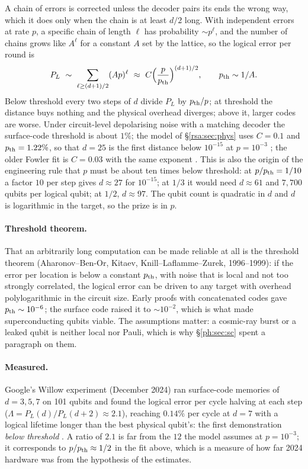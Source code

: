 A chain of errors is corrected unless the decoder pairs its ends the wrong way, which it does
only when the chain is at least $d/2$ long. With independent errors at rate $p$, a specific chain
of length $\ell$ has probability $\sim p^\ell$, and the number of chains grows like $A^\ell$ for a
constant $A$ set by the lattice, so the logical error per round is
\[ P_L\ \sim\ \sum_{\ell\ge(d+1)/2}(Ap)^\ell\ \approx\ C\Big(\frac p{p_{\rm th}}\Big)^{(d+1)/2},
   \qquad p_{\rm th}\sim1/A . \]
Below threshold every two steps of $d$ divide $P_L$ by $p_{\rm th}/p$; at threshold the distance
buys nothing and the physical overhead diverges; above it, larger codes are worse. Under
circuit-level depolarising noise with a matching decoder the surface-code threshold is about
$1\%$; the model of \S\ref{rsa:sec:phys} uses $C=0.1$ and $p_{\rm th}=1.22\%$, so that $d=25$ is
the first distance below $10^{-15}$ at $p=10^{-3}$ \cite{ec:gidney25rsa}; the older Fowler fit is
$C=0.03$ with the same exponent \cite{ph:fowler12}. This is also the origin of the engineering
rule that $p$ must be about ten times below threshold: at $p/p_{\rm th}=1/10$ a factor $10$ per
step gives $d\approx27$ for $10^{-15}$; at $1/3$ it would need $d\approx61$ and $7,700$ qubits
per logical qubit; at $1/2$, $d\approx97$. The qubit count is quadratic in $d$ and $d$ is
logarithmic in the target, so the prize is in $p$.

\paragraph{Threshold theorem.} That an arbitrarily long computation can be made reliable at all
is the threshold theorem (Aharonov--Ben-Or, Kitaev, Knill--Laflamme--Zurek, 1996--1999): if the
error per location is below a constant $p_{\rm th}$, with noise that is local and not too
strongly correlated, the logical error can be driven to any target with overhead polylogarithmic
in the circuit size. Early proofs with concatenated codes gave $p_{\rm th}\sim10^{-6}$; the
surface code raised it to $\sim10^{-2}$, which is what made superconducting qubits viable. The
assumptions matter: a cosmic-ray burst or a leaked qubit is neither local nor Pauli, which is why
\S\ref{ph:sec:sc} spent a paragraph on them.

\paragraph{Measured.} Google's Willow experiment (December 2024) ran surface-code memories of
$d=3,5,7$ on 101 qubits and found the logical error per cycle halving at each step
($\Lambda=P_L(d)/P_L(d+2)\approx2.1$), reaching $0.14\%$ per cycle at $d=7$ with a logical
lifetime longer than the best physical qubit's: the first demonstration \emph{below threshold}
\cite{ph:willow24}. A ratio of $2.1$ is far from the $12$ the model assumes at
$p=10^{-3}$; it corresponds to $p/p_{\rm th}\approx1/2$ in the fit above, which is a measure of
how far 2024 hardware was from the hypothesis of the estimates.

